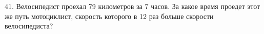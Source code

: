 41. Велосипедист проехал 79 километров за 7 часов. За какое время проедет этот же путь мотоциклист, скорость которого в 12 раз больше скорости велосипедиста?\\
